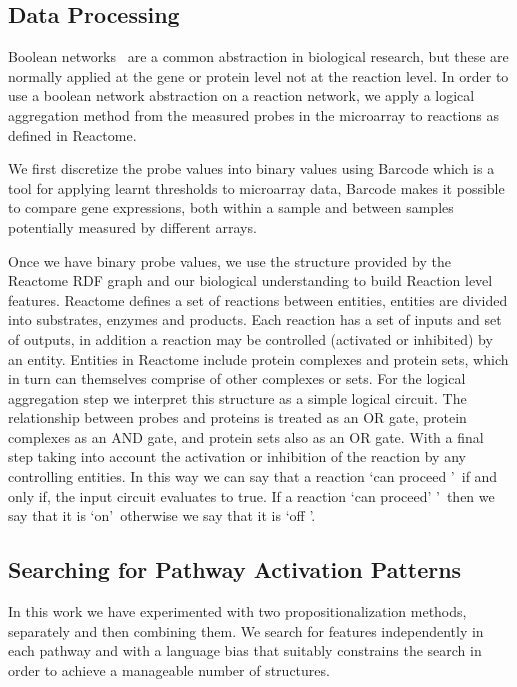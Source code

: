 \documentclass[runningheads,a4paper]{llncs}
\begin{document}
\subsection{Data Processing}
Boolean networks~\citep{wang_boolean_2012} are a common abstraction in biological research, but these are normally applied at the gene or protein level not at the reaction level. In order to use a boolean network abstraction on a reaction network, we apply a logical aggregation method from the measured probes in the microarray to reactions as defined in Reactome.

We first discretize the probe values into binary values using Barcode \citep{mccall_gene_2014} which is a tool for applying learnt thresholds to microarray data,  Barcode makes it possible to compare gene expressions, both within a sample and between samples potentially measured by different arrays. 

Once we have binary probe values, we use the structure provided by
the Reactome RDF graph and our biological understanding to build Reaction level features.
Reactome defines a set of reactions between entities, entities are divided into substrates, enzymes and products. Each reaction has a set of inputs and set of outputs, in addition a reaction may be controlled (activated or inhibited) by an entity. Entities in Reactome include protein complexes and protein sets, which in turn can themselves comprise of other complexes or sets. For the logical aggregation step we interpret this structure as a simple logical circuit. The relationship between probes and proteins is treated as an OR gate, protein complexes as an AND gate, and protein sets also as an OR gate. With a final step taking into account the activation or inhibition of the reaction by any controlling entities. In this way we can say that a reaction \lq can proceed \rq\ if and only if, the input circuit evaluates to true. If a reaction \lq can proceed' \rq\ then we say that it is \lq on\rq\ otherwise we say that it is \lq off \rq. %

\subsection{Searching for Pathway Activation Patterns}
In this work we have experimented with two propositionalization methods, separately and then combining them. We search for features independently in each pathway and with a language bias that suitably constrains the search in order to achieve a manageable number of structures. 
\end{document}
